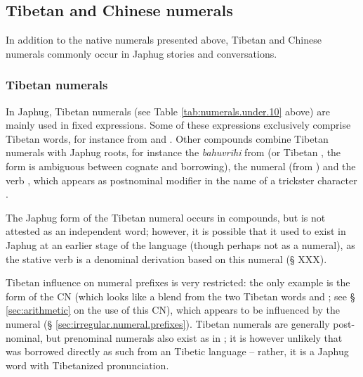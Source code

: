  \subsection{Tibetan and Chinese numerals}  
 In addition to the native numerals presented above, Tibetan and Chinese numerals commonly occur in Japhug stories and conversations.

 \subsubsection{Tibetan numerals} \label{sec:tibetan.numerals}

In Japhug, Tibetan numerals (see Table \ref{tab:numerals.under.10} above) are mainly used in fixed expressions. Some of these expressions exclusively comprise Tibetan words, for instance  from  and .  Other compounds combine Tibetan numerals with Japhug roots, for instance the \textit{bahuvrīhi}   from  (or Tibetan , the form is ambiguous between cognate and borrowing), the numeral  (from  ) and the verb , which appears as postnominal modifier in the name of a trickster character .
 
 The Japhug form  of the Tibetan numeral   occurs in compounds, but is not attested as an independent word; however, it is possible that  it used to exist in Japhug at an earlier stage of the language (though perhaps not as a numeral), as the stative verb  is a denominal derivation based on this numeral (§ XXX). 

Tibetan influence on numeral prefixes is very restricted: the only example is the form  of the CN  (which looks like a blend from the two Tibetan words  and ; see § \ref{sec:arithmetic} on the use of this CN), which appears to be influenced by the numeral   (§ \ref{sec:irregular.numeral.prefixes}). Tibetan numerals are generally post-nominal, but prenominal numerals also exist as in ; it is however unlikely that  was borrowed directly as such from an Tibetic language -- rather, it is a Japhug word with Tibetanized pronunciation.

